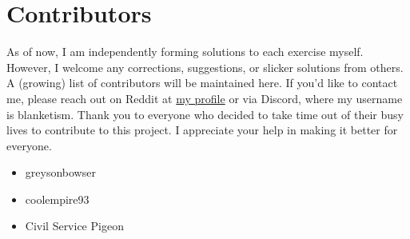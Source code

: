 \section*{Contributors}

As of now, I am independently forming solutions to each exercise myself.
	However, I welcome any corrections, suggestions, or slicker solutions from others.
	A (growing) list of contributors will be maintained here.
	If you'd like to contact me, please reach out on Reddit at \href{https://www.reddit.com/user/ansv9a8fdh3/}{my profile} or via Discord, where my username is blanketism.
	Thank you to everyone who decided to take time out of their busy lives to contribute to this project.
	I appreciate your help in making it better for everyone.
\begin{itemize}
    \item greysonbowser
    \item coolempire93
    \item Civil Service Pigeon
\end{itemize}